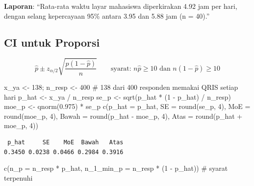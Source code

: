 \documentclass[
  indonesian,
  letterpaper,
]{book}
\newenvironment{Shaded}{\begin{snugshade}}{\end{snugshade}}
\newcommand{\AttributeTok}[1]{\textcolor[rgb]{0.40,0.45,0.13}{#1}}
\newcommand{\CommentTok}[1]{\textcolor[rgb]{0.37,0.37,0.37}{#1}}
\newcommand{\DecValTok}[1]{\textcolor[rgb]{0.68,0.00,0.00}{#1}}
\newcommand{\FloatTok}[1]{\textcolor[rgb]{0.68,0.00,0.00}{#1}}
\newcommand{\FunctionTok}[1]{\textcolor[rgb]{0.28,0.35,0.67}{#1}}
\newcommand{\NormalTok}[1]{\textcolor[rgb]{0.00,0.23,0.31}{#1}}
\newcommand{\OtherTok}[1]{\textcolor[rgb]{0.00,0.23,0.31}{#1}}
\newcommand{\SpecialCharTok}[1]{\textcolor[rgb]{0.37,0.37,0.37}{#1}}
\begin{document}
\textbf{Laporan}: ``Rata-rata waktu layar mahasiswa diperkirakan 4.92
jam per hari, dengan selang kepercayaan 95\% antara 3.95 dan 5.88 jam (n
= 40).''

\subsection{CI untuk Proporsi}\label{ci-untuk-proporsi}

\[\hat{p} \pm z_{\alpha/2}\sqrt{\frac{\hat{p}(1 - \hat{p})}{n}} \qquad \text{syarat: } n\hat{p} \ge 10 \text{ dan } n(1 - \hat{p}) \ge 10\]

\begin{Shaded}
\begin{Highlighting}[]
\NormalTok{x\_ya }\OtherTok{\textless{}{-}} \DecValTok{138}\NormalTok{; n\_resp }\OtherTok{\textless{}{-}} \DecValTok{400} \CommentTok{\# 138 dari 400 responden memakai QRIS setiap hari}
\NormalTok{p\_hat }\OtherTok{\textless{}{-}}\NormalTok{ x\_ya }\SpecialCharTok{/}\NormalTok{ n\_resp}
\NormalTok{se\_p }\OtherTok{\textless{}{-}} \FunctionTok{sqrt}\NormalTok{(p\_hat }\SpecialCharTok{*}\NormalTok{ (}\DecValTok{1} \SpecialCharTok{{-}}\NormalTok{ p\_hat) }\SpecialCharTok{/}\NormalTok{ n\_resp)}
\NormalTok{moe\_p }\OtherTok{\textless{}{-}} \FunctionTok{qnorm}\NormalTok{(}\FloatTok{0.975}\NormalTok{) }\SpecialCharTok{*}\NormalTok{ se\_p}
\FunctionTok{c}\NormalTok{(}\AttributeTok{p\_hat =}\NormalTok{ p\_hat, }\AttributeTok{SE =} \FunctionTok{round}\NormalTok{(se\_p, }\DecValTok{4}\NormalTok{), }\AttributeTok{MoE =} \FunctionTok{round}\NormalTok{(moe\_p, }\DecValTok{4}\NormalTok{),}
\AttributeTok{Bawah =} \FunctionTok{round}\NormalTok{(p\_hat }\SpecialCharTok{{-}}\NormalTok{ moe\_p, }\DecValTok{4}\NormalTok{), }\AttributeTok{Atas =} \FunctionTok{round}\NormalTok{(p\_hat }\SpecialCharTok{+}\NormalTok{ moe\_p, }\DecValTok{4}\NormalTok{))}
\end{Highlighting}
\end{Shaded}

\begin{verbatim}
 p_hat     SE    MoE  Bawah   Atas 
0.3450 0.0238 0.0466 0.2984 0.3916 
\end{verbatim}

\begin{Shaded}
\begin{Highlighting}[]
\FunctionTok{c}\NormalTok{(}\AttributeTok{n\_p =}\NormalTok{ n\_resp }\SpecialCharTok{*}\NormalTok{ p\_hat, }\AttributeTok{n\_1\_min\_p =}\NormalTok{ n\_resp }\SpecialCharTok{*}\NormalTok{ (}\DecValTok{1} \SpecialCharTok{{-}}\NormalTok{ p\_hat)) }\CommentTok{\# syarat terpenuhi}
\end{Highlighting}
\end{Shaded}
\end{document}
